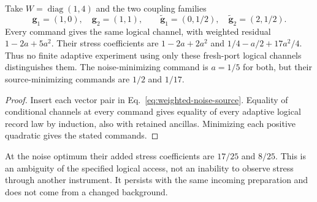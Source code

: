\begin{proposition}
\label{prop:weighted-source-ambiguity}
Take $W=\operatorname{diag}(1,4)$ and the two coupling families
\[
 \mathbf g_1=(1,0),\quad\mathbf g_2=(1,1),\qquad
 \widetilde{\mathbf g}_1=(0,1/2),\quad
 \widetilde{\mathbf g}_2=(2,1/2).
\]
Every command gives the same logical channel, with weighted residual
$1-2a+5a^2$. Their stress coefficients are
$1-2a+2a^2$ and $1/4-a/2+17a^2/4$.
Thus no finite adaptive experiment using only these fresh-port logical
channels distinguishes them. The noise-minimizing command is $a=1/5$
for both, but their source-minimizing commands are $1/2$ and $1/17$.
\end{proposition}
\begin{proof}
Insert each vector pair in Eq.~\eqref{eq:weighted-noise-source}.
Equality of conditional channels at every command gives equality of every
adaptive logical record law by induction, also with retained ancillas.
Minimizing each positive quadratic gives the stated commands.
\end{proof}
At the noise optimum their added stress coefficients are $17/25$ and
$8/25$. This is an ambiguity of the specified logical access, not an
inability to observe stress through another instrument. It persists with
the same incoming preparation and does not come from a changed background.

